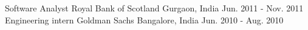 \begin{cventries}
  \cventry
    {Software Analyst}
    {Royal Bank of Scotland}
    {Gurgaon, India}
    {Jun. 2011 -  Nov. 2011}
  \cventry
    {Engineering intern}
    {Goldman Sachs}
    {Bangalore, India}
    {Jun. 2010 - Aug. 2010} 
\end{cventries}
